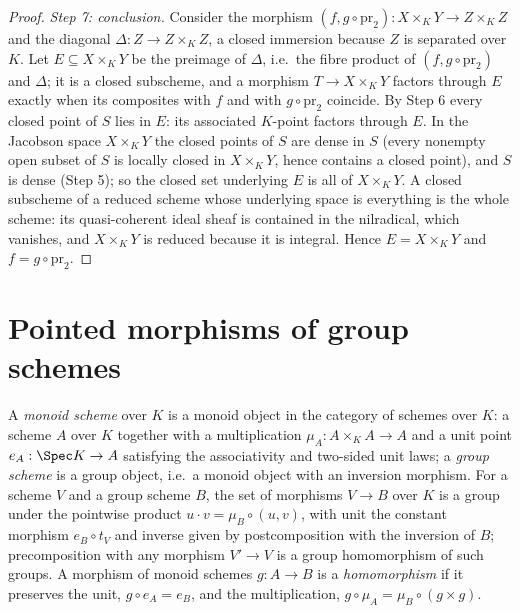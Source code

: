 \begin{proof}
  \emph{Step 7: conclusion.} Consider the morphism
  \((f, g \circ \mathrm{pr}_2) : X \times_K Y \to Z \times_K Z\) and the diagonal
  \(\Delta : Z \to Z \times_K Z\), a closed immersion because \(Z\) is separated over
  \(K\). Let \(E \subseteq X \times_K Y\) be the preimage of \(\Delta\), i.e.\ the fibre
  product of \((f, g \circ \mathrm{pr}_2)\) and \(\Delta\); it is a closed subscheme, and a
  morphism \(T \to X \times_K Y\) factors through \(E\) exactly when its composites with
  \(f\) and with \(g \circ \mathrm{pr}_2\) coincide. By Step 6 every closed point of \(S\)
  lies in \(E\): its associated \(K\)-point factors through \(E\). In the Jacobson space
  \(X \times_K Y\) the closed points of \(S\) are dense in \(S\) (every nonempty open subset
  of \(S\) is locally closed in \(X \times_K Y\), hence contains a closed point), and \(S\)
  is dense (Step 5); so the closed set underlying \(E\) is all of \(X \times_K Y\). A closed
  subscheme of a reduced scheme whose underlying space is everything is the whole scheme:
  its quasi-coherent ideal sheaf is contained in the nilradical, which vanishes, and
  \(X \times_K Y\) is reduced because it is integral. Hence \(E = X \times_K Y\) and
  \(f = g \circ \mathrm{pr}_2\).
\end{proof}

\section{Pointed morphisms of group schemes}

A \emph{monoid scheme} over \(K\) is a monoid object in the category of schemes over \(K\):
a scheme \(A\) over \(K\) together with a multiplication \(\mu_A : A \times_K A \to A\) and a
unit point \(e_A : \Spec K \to A\) satisfying the associativity and two-sided unit laws; a
\emph{group scheme} is a group object, i.e.\ a monoid object with an inversion morphism. For
a scheme \(V\) and a group scheme \(B\), the set of morphisms \(V \to B\) over \(K\) is a
group under the pointwise product \(u \cdot v = \mu_B \circ (u, v)\), with unit the constant
morphism \(e_B \circ t_V\) and inverse given by postcomposition with the inversion of \(B\);
precomposition with any morphism \(V' \to V\) is a group homomorphism of such groups. A
morphism of monoid schemes \(g : A \to B\) is a \emph{homomorphism} if it preserves the unit,
\(g \circ e_A = e_B\), and the multiplication,
\(g \circ \mu_A = \mu_B \circ (g \times g)\).


